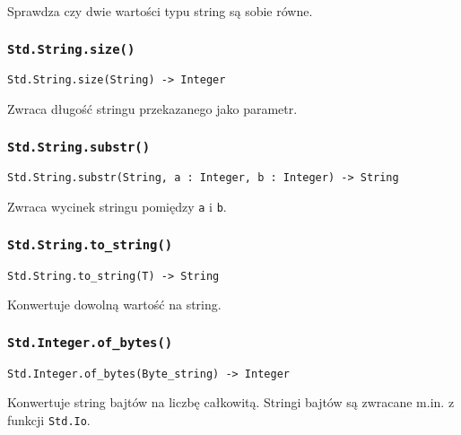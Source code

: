 Sprawdza czy dwie wartości typu string są sobie równe.

\subsubsection{\texttt{Std.String.size()}}

\begin{small}
\begin{lstlisting}
Std.String.size(String) -> Integer
\end{lstlisting}
\end{small}

Zwraca długość stringu przekazanego jako parametr.

\subsubsection{\texttt{Std.String.substr()}}

\begin{small}
\begin{lstlisting}
Std.String.substr(String, a : Integer, b : Integer) -> String
\end{lstlisting}
\end{small}

Zwraca wycinek stringu pomiędzy \texttt{a} i \texttt{b}.

\subsubsection{\texttt{Std.String.to\_string()}}

\begin{small}
\begin{lstlisting}
Std.String.to_string(T) -> String
\end{lstlisting}
\end{small}

Konwertuje dowolną wartość na string.

\subsubsection{\texttt{Std.Integer.of\_bytes()}}

\begin{small}
\begin{lstlisting}
Std.Integer.of_bytes(Byte_string) -> Integer
\end{lstlisting}
\end{small}

Konwertuje string bajtów na liczbę całkowitą. Stringi bajtów są zwracane m.in. z
funkcji \texttt{Std.Io}.

